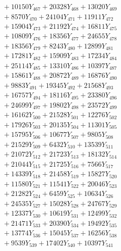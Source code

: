 \documentclass[a4paper,10pt]{article}
\begin{document}
{\begin{align}
&\;  + 10150 Y_{467} + 20328 Y_{468} + 13020 Y_{469} \\[0.3ex]
&\;  + 8570 Y_{470} + 24104 Y_{471} + 11911 Y_{472} \\[0.3ex]
&\;  + 15904 Y_{473} + 21192 Y_{474} + 16811 Y_{475} \\[0.3ex]
&\;  + 10809 Y_{476} + 18356 Y_{477} + 24655 Y_{478} \\[0.5ex]\allowbreak
&\;  + 18356 Y_{479} + 8243 Y_{480} + 12899 Y_{481} \\[0.3ex]
&\;  + 17281 Y_{482} + 15909 Y_{483} + 17234 Y_{484} \\[0.3ex]
&\;  + 25114 Y_{485} + 13310 Y_{486} + 10397 Y_{487} \\[0.3ex]
&\;  + 15861 Y_{488} + 20872 Y_{489} + 16876 Y_{490} \\[0.3ex]
&\;  + 9883 Y_{491} + 19345 Y_{492} + 21568 Y_{493} \\[0.3ex]
&\;  + 16757 Y_{494} + 18116 Y_{495} + 23380 Y_{496} \\[0.3ex]
&\;  + 24699 Y_{497} + 19802 Y_{498} + 23572 Y_{499} \\[0.3ex]
&\;  + 16162 Y_{500} + 21528 Y_{501} + 12276 Y_{502} \\[0.3ex]
&\;  + 17926 Y_{503} + 20135 Y_{504} + 11301 Y_{505} \\[0.3ex]
&\;  + 15795 Y_{506} + 10677 Y_{507} + 9805 Y_{508} \\[0.5ex]\allowbreak
&\;  + 21529 Y_{509} + 6432 Y_{510} + 13539 Y_{511} \\[0.3ex]
&\;  + 21072 Y_{512} + 21723 Y_{513} + 18132 Y_{514} \\[0.3ex]
&\;  + 21044 Y_{515} + 21725 Y_{516} + 7566 Y_{517} \\[0.3ex]
&\;  + 14339 Y_{518} + 21458 Y_{519} + 15827 Y_{520} \\[0.3ex]
&\;  + 11580 Y_{521} + 11541 Y_{522} + 20046 Y_{523} \\[0.3ex]
&\;  + 21282 Y_{524} + 6459 Y_{525} + 10634 Y_{526} \\[0.3ex]
&\;  + 24535 Y_{527} + 15028 Y_{528} + 24767 Y_{529} \\[0.3ex]
&\;  + 12337 Y_{530} + 10619 Y_{531} + 12499 Y_{532} \\[0.3ex]
&\;  + 21471 Y_{533} + 20390 Y_{534} + 19492 Y_{535} \\[0.3ex]
&\;  + 13774 Y_{536} + 15045 Y_{537} + 16256 Y_{538} \\[0.5ex]\allowbreak
&\;  + 9539 Y_{539} + 17402 Y_{540} + 10397 Y_{541} \\[0.3ex]

\end{align}}
\end{document}
